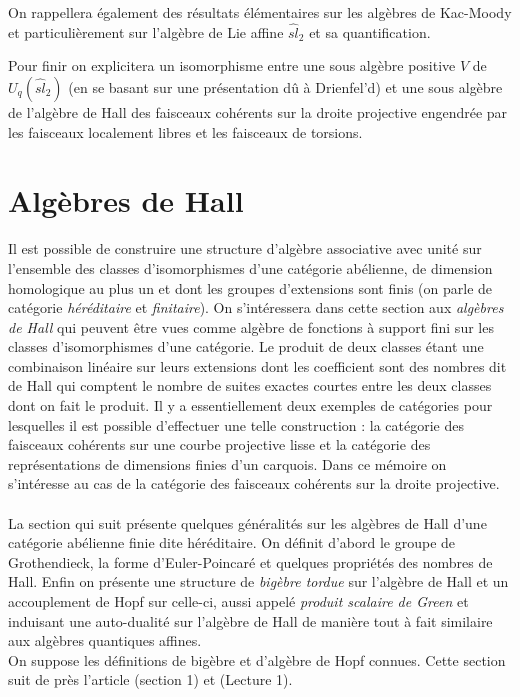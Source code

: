\documentclass[12pt]{article}
\theoremstyle{definition}
\begin{document}
On rappellera également des résultats élémentaires sur les algèbres de Kac-Moody et particulièrement sur l'algèbre de Lie affine $\widehat{sl}_2$ et sa quantification.\vspace{0.5cm}

Pour finir on explicitera un isomorphisme entre une sous algèbre positive $V$ de $U_q(\widehat{sl}_2)$ (en se basant sur une présentation dû à Drienfel'd) et une sous algèbre de l'algèbre de Hall des faisceaux cohérents sur la droite projective engendrée par les faisceaux localement libres et les faisceaux de torsions. 
\pagebreak
\section{Algèbres de Hall}
Il est possible de construire une structure d'algèbre associative avec unité sur l'ensemble des classes d'isomorphismes d'une catégorie abélienne, de dimension homologique au plus un et dont les groupes d'extensions sont finis (on parle de catégorie \textit{héréditaire} et \textit{finitaire}). On s'intéressera dans cette section aux \textit{algèbres de Hall} qui peuvent être vues comme algèbre de fonctions à support fini sur les classes d'isomorphismes d'une catégorie. Le produit de deux classes étant une combinaison linéaire sur leurs extensions dont les coefficient sont des nombres dit de Hall qui comptent le nombre de suites exactes courtes entre les deux classes dont on fait le produit. Il y a essentiellement deux exemples de catégories pour lesquelles il est possible d'effectuer une telle construction : la catégorie des faisceaux cohérents sur une courbe projective lisse et la catégorie des représentations de dimensions finies d'un carquois. Dans ce mémoire on s'intéresse au cas de la catégorie des faisceaux cohérents sur la droite projective.\\\\ La section qui suit présente quelques généralités sur les algèbres de Hall d'une catégorie abélienne finie dite héréditaire. On définit d'abord le groupe de Grothendieck, la forme d'Euler-Poincaré et quelques propriétés des nombres de Hall. Enfin on présente une structure de \textit{bigèbre tordue} sur l'algèbre de Hall et un accouplement de Hopf sur celle-ci, aussi appelé \textit{produit scalaire de Green} et induisant une auto-dualité sur l'algèbre de Hall de manière tout à fait similaire aux algèbres quantiques affines.  \\ On suppose les définitions de bigèbre et d'algèbre de Hopf connues. Cette section suit de près l'article \cite{Baum} (section 1) et \cite{schif} (Lecture 1).
\end{document}
